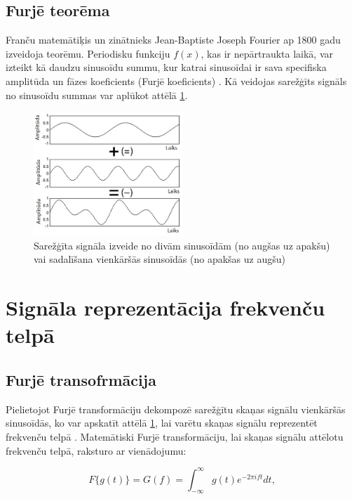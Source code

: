 \documentclass[12pt,paper=A4]{report}
\begin{document}
\FloatBarrier
\subsection{Furjē teorēma} 

Franču matemātiķis un zinātnieks Jean-Baptiste Joseph Fourier ap 1800 gadu izveidoja teorēmu. Periodisku funkciju $f(x)$, kas ir nepārtraukta laikā, var izteikt kā daudzu sinusoīdu summu, kur katrai sinusoīdai ir sava specifiska amplitūda un fāzes koeficients (Furjē koeficients) \cite{Foure}. Kā veidojas sarežģīts signāls no sinusoīdu summas var aplūkot attēlā \ref{Fourier}. 
\begin{figure}[H] \centering
\includegraphics[width=0.50\textwidth]{sumofsines} 
\caption{Sarežģīta signāla izveide no divām sinusoīdām (no augšas uz apakšu) vai sadalīšana vienkāršās sinusoīdās (no apakšas uz augšu) \cite{Foure}}  \label{Fourier} 
\end{figure}

\FloatBarrier

\section{Signāla reprezentācija frekvenču telpā}

\subsection{Furjē transofrmācija}
Pielietojot Furjē transformāciju dekompozē sarežģītu skaņas signālu vienkāršās sinusoīdās, ko var apskatīt attēlā \ref{Fourier}, lai varētu skaņas signālu reprezentēt frekvenču telpā \cite{http://www.thefouriertransform.com/transform/fourier.php}. Matemātiski Furjē transformāciju, lai skaņas signālu attēlotu frekvenču telpā, raksturo ar vienādojumu:

\begin{equation}
F\{g(t)\}= G(f) = \int_{-\infty}^\infty g(t)e^{-2\pi ift} dt,
\end{equation}
\end{document}

